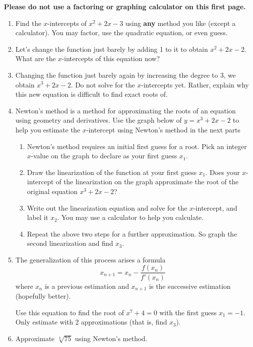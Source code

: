 \documentclass[letterpaper,11pt]{article}
\begin{document}
\textbf{Please do not use a factoring or graphing calculator on this first page.}

\begin{enumerate}

\item Find the $x$-intercepts of $x^2 + 2x -3$ using \textbf{any} method you like (except a calculator). You may factor, use the quadratic equation, or even guess.
\vfill
\item Let's change the function just barely by adding 1 to it to obtain $x^2 + 2x -2$. What are the $x$-intercepts of this equation now?
\vfill
\item Changing the function just barely again by increasing the degree to 3, we obtain $x^3 + 2x - 2$. Do not solve for the $x$-intercepts yet. Rather, explain why this new equation is difficult to find exact roots of.
\vfill

\newpage
\item Newton's method is a method for approximating the roots of an equation using geometry and derivatives. Use the graph below of $y=x^3 + 2x -2$ to help you estimate the $x$-intercept using Newton's method in the next parts

\begin{center}
\end{center}
\newpage
\begin{enumerate}
    \item Newton's method requires an initial first guess for a root. Pick an integer $x$-value on the graph to declare as your first guess $x_1$.
    \vspace{1in}
    \item Draw the linearization of the function at your first guess $x_1$. Does your $x$-intercept of the linearization on the graph approximate the root of the original equation $x^3 + 2x -2$?
    \vfill
    \item Write out the linearization equation and solve for the $x$-intercept, and label it $x_2$. You may use a calculator to help you calculate.
    \vfill
    \item Repeat the above two steps for a further approximation. So graph the second linearization and find $x_3$.
    \vfill
    \vfill
\end{enumerate}
\newpage
\item The generalization of this process arises a formula 
\[x_{n+1} = x_n - \frac{f(x_n)}{f'(x_n)}\] 
where $x_n$ is a previous estimation and $x_{n+1}$ is the successive estimation (hopefully better).

Use this equation to find the root of $x^7 + 4 = 0$ with the first guess $x_1 = -1$. Only estimate with 2 approximations (that is, find $x_3$).
\vfill
\newpage
\item Approximate $\sqrt[4]{75}$ using Newton's method.
\vfill

\end{enumerate}
\end{document}
